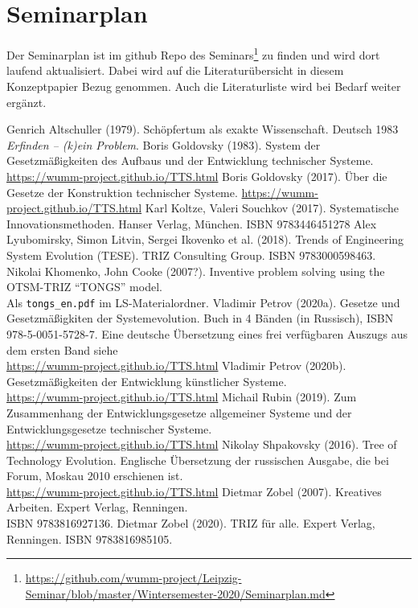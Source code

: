 \documentclass[11pt,a4paper]{article}
\begin{document}
\section{Seminarplan}

Der Seminarplan ist im github Repo des
Seminars\footnote{\url{https://github.com/wumm-project/Leipzig-Seminar/blob/master/Wintersemester-2020/Seminarplan.md}} zu
finden und wird dort laufend aktualisiert.  Dabei wird auf die
Literaturübersicht in diesem Konzeptpapier Bezug genommen. Auch die
Literaturliste wird bei Bedarf weiter ergänzt.

\begin{thebibliography}{xxx}
 Genrich Altschuller (1979).  Schöpfertum als exakte
  Wissenschaft.  Deutsch 1983 \emph{Erfinden -- (k)ein Problem}.
 Boris Goldovsky (1983). System der Gesetzmäßigkeiten
  des Aufbaus und der Entwicklung technischer Systeme.
  \url{https://wumm-project.github.io/TTS.html}
 Boris Goldovsky (2017). Über die Gesetze der
  Konstruktion technischer Systeme.  
  \url{https://wumm-project.github.io/TTS.html}
 Karl Koltze, Valeri Souchkov (2017).
  Systematische Innovationsmethoden.  Hanser Verlag, München. ISBN
  9783446451278
 Alex Lyubomirsky, Simon Litvin, Sergei Ikovenko et al.
  (2018). Trends of Engineering System Evolution (TESE).  TRIZ Consulting
  Group. ISBN 9783000598463.
 Nikolai Khomenko, John Cooke (2007?).  Inventive
  problem solving using the OTSM-TRIZ “TONGS” model. \\
  Als \texttt{tongs\_en.pdf} im LS-Materialordner.
 Vladimir Petrov (2020a). Gesetze und Gesetzmäßigkiten
  der Systemevolution. Buch in 4 Bänden (in Russisch), ISBN
  978-5-0051-5728-7.  Eine deutsche Übersetzung eines frei verfügbaren Auszugs
  aus dem ersten Band siehe \\
  \url{https://wumm-project.github.io/TTS.html}
 Vladimir Petrov (2020b). Gesetzmäßigkeiten der
  Entwicklung künstlicher Systeme. \\
  \url{https://wumm-project.github.io/TTS.html} 
 Michail Rubin (2019). Zum Zusammenhang der
  Entwicklungsgesetze allgemeiner Systeme und der Entwicklungsgesetze
  technischer Systeme. \\ \url{https://wumm-project.github.io/TTS.html}
 Nikolay Shpakovsky (2016). Tree of Technology
  Evolution. Englische Übersetzung der russischen Ausgabe, die bei Forum,
  Moskau 2010 erschienen ist.\\ \url{https://wumm-project.github.io/TTS.html}
 Dietmar Zobel (2007). Kreatives Arbeiten. Expert Verlag,
  Renningen.\\ ISBN 9783816927136.
 Dietmar Zobel (2020). TRIZ für alle. Expert Verlag,
  Renningen. ISBN 9783816985105.
\end{thebibliography}
\end{document}
